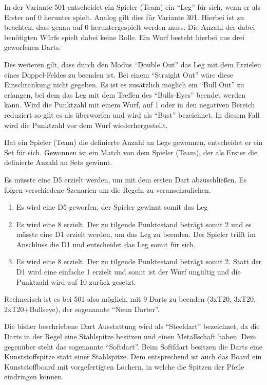 In der Variante 501 entscheidet ein Spieler (Team) ein "`Leg"' für sich, wenn er als Erster auf 0 herunter spielt. Analog gilt dies für Variante 301.
Hierbei ist zu beachten, dass genau auf 0 heruntergespielt werden muss.
Die Anzahl der dabei benötigten Würfe spielt dabei keine Rolle. Ein Wurf besteht hierbei aus drei geworfenen Darts.
 
Des weiteren gilt, dass durch den Modus "`Double Out"' das Leg mit dem Erzielen eines Doppel-Feldes zu beenden ist. Bei einem "`Straight Out"' wäre diese Einschränkung nicht gegeben.
Es ist es zusätzlich möglich ein "`Bull Out"' zu erlangen, bei dem das Leg mit dem Treffen des "`Bulls-Eyes"' beendet werden kann. 
Wird die Punktzahl mit einem Wurf, auf 1 oder in den negativen Bereich reduziert so gilt es als überworfen und wird als "`Bust"' bezeichnet. In diesem Fall wird die Punktzahl vor dem Wurf wiederhergestellt. \autocite[5]{DartsRegel2016} 

Hat ein Spieler (Team) die definierte Anzahl an Legs gewonnen, entscheidet er ein Set für sich. Gewonnen ist ein Match von dem Spieler (Team), der als Erster die definierte Anzahl an Sets gewinnt.

\begin{example*} 

Es müsste eine D5 erzielt werden, um mit dem ersten Dart abzuschließen. Es folgen verschiedene Szenarien um die Regeln zu veranschaulichen.
\begin{enumerate}
	\item Es wird eine D5 geworfen, der Spieler gewinnt somit das Leg
	\item Es wird eine 8 erzielt. Der zu tilgende Punktestand beträgt somit 2 und es müsste eine D1 erzielt werden, um das Leg zu beenden. Der Spieler trifft im Anschluss die D1 und entscheidet das Leg somit für sich. 
	\item Es wird eine 8 erzielt. Der zu tilgende Punktestand beträgt somit 2. Statt der D1 wird eine einfache 1 erzielt und somit ist der Wurf ungültig und die Punktzahl wird auf 10 zurück gesetzt.
\end{enumerate}
\end{example*}

Rechnerisch ist es bei 501 also möglich, mit 9 Darts zu beenden (3xT20, 3xT20, 2xT20+Bullseye), der sogenannte "`Neun Darter"'.

Die bisher beschriebene Dart Ausstattung wird als "`Steeldart"' bezeichnet, da die Darts in der Regel eine Stahlspitze besitzen und einen Metallschaft haben. Dem gegenüber steht das sogenannte "`Softdart"'. Beim Softfdart besitzen die Darts eine Kunststoffspitze statt einer Stahlspitze. Dem entsprechend ist auch das Board ein Kunststoffboard mit vorgefertigten Löchern, in welche die Spitzen der Pfeile eindringen können. 


